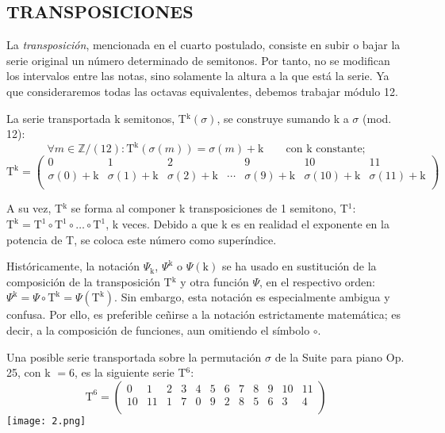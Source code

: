 	\subsection{TRANSPOSICIONES}
		La \emph{transposición}, mencionada en el cuarto postulado, consiste en subir o bajar la serie original un número determinado de semitonos. Por tanto, no se modifican los intervalos entre las notas, sino solamente la altura a la que está la serie. Ya que consideraremos todas las octavas equivalentes, debemos trabajar módulo 12. 
		
		La serie transportada k semitonos, T$^\text{k}\left(\sigma\right)$, se construye sumando k a $\sigma$ (mod. 12):
		$$
		\forall m\in \mathbb{Z} / (12):	\text{T}^\text{k}\left(\sigma\left(m\right)\right)=\sigma\left(m\right)+\text{k} \qquad \text{con k constante;}
		$$		
		$$
		\text{T}^\text{k}=\left(\begin{matrix}0&1&2&&9&10&11\\\sigma\left(0\right)+\text{k}&\sigma\left(1\right)+\text{k}&\sigma\left(2\right)+\text{k}&\cdots&\sigma\left(9\right)+\text{k}&\sigma\left(10\right)+\text{k}&\sigma\left(11\right)+\text{k}\\\end{matrix}\right)
		$$
		
		A su vez, T$^\text{k}$ se forma al componer k transposiciones de 1 semitono, T$^1$: $\text{T}^\text{k}=\text{T}^1\circ\text{T}^1\circ\ldots\circ\text{T}^1$, k veces. Debido a que k es en realidad el exponente en la potencia de T, se coloca este número como superíndice.
		
		Históricamente, la notación $\Psi_\text{k}$, $\Psi^\text{k}$ o $\Psi(\text{k})$ se ha usado en sustitución de la composición de la transposición T$^\text{k}$ y otra función $\Psi$, en el respectivo orden: $\Psi^\text{k}=\Psi \circ \text{T}^\text{k} = \Psi(\text{T}^\text{k})$. Sin embargo, esta notación es especialmente ambigua y confusa. Por ello, es preferible ceñirse a la notación estrictamente matemática; es decir, a la composición de funciones, aun omitiendo el símbolo $\circ$.
		
		Una posible serie transportada sobre la permutación $\sigma$ de la Suite para piano Op. 25, con k $= 6$, es la siguiente serie T$^6$:
		$$\text{T}^6=\left(\begin{matrix}0&1&2&3&4&5&6&7&8&9&10&11\\10&11&1&7&0&9&2&8&5&6&3&4\\\end{matrix}\right)$$	
		\texttt{[image: 2.png]}
		
